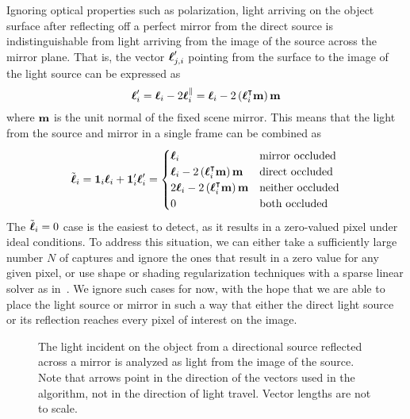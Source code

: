 Ignoring optical properties such as polarization, light arriving on the object
surface after reflecting off a perfect mirror from the direct source is
indistinguishable from light arriving from the image of the source across the
mirror plane. That is, the vector $\boldsymbol{\ell}_{j, i}'$ pointing from the surface to
the image of the light source can be expressed as
\begin{equation} \label{eq:light-reflection}
  \boldsymbol{\ell}_i' = \boldsymbol{\ell}_i - 2 \boldsymbol{\ell}_i^\parallel
            = \boldsymbol{\ell}_i - 2 \left(\boldsymbol{\ell}_i^\intercal \mathbf{m}\right) \mathbf{m}
\end{equation}
where $\mathbf{m}$ is the unit normal of the fixed scene mirror. This means that the
light from the source and mirror in a single frame can be
combined as
\begin{equation} \label{eq:combinations}
  \tilde{\boldsymbol{\ell}}_i = \mathbf{1}_i \boldsymbol{\ell}_i + \mathbf{1}_i' \boldsymbol{\ell}_i'
                   = \begin{cases}
    \boldsymbol{\ell}_i                                                       & \textrm{mirror occluded} \\
    \boldsymbol{\ell}_i - 2 \left(\boldsymbol{\ell}_i^\intercal \mathbf{m}\right) \mathbf{m}   & \textrm{direct occluded} \\
    2 \boldsymbol{\ell}_i - 2 \left(\boldsymbol{\ell}_i^\intercal \mathbf{m}\right) \mathbf{m} & \textrm{neither occluded} \\
    0                                                              & \textrm{both occluded}
  \end{cases}
\end{equation}
The $\tilde{\boldsymbol{\ell}}_i = 0$ case is the easiest to detect, as it results in a
zero-valued pixel under ideal conditions. To address this situation, we can
either take a sufficiently large number $N$ of captures and ignore the ones
that result in a zero value for any given pixel, or use shape or shading
regularization techniques with a sparse linear solver as in~\cite{hernandez}.
We ignore such cases for now, with the hope that we are able to place the light
source or mirror in such a way that either the direct light source or its
reflection reaches every pixel of interest on the image.
\begin{figure}
  
  \caption{The light incident on the object from a directional source reflected
  across a mirror is analyzed as light from the image of the source. Note that
  arrows point in the direction of the vectors used in the algorithm, not in
  the direction of light travel. Vector lengths are not to scale.}\label{fig:light-reflection}
\end{figure}

